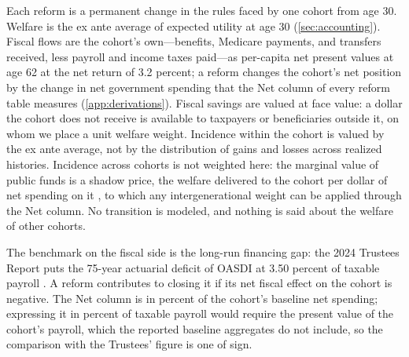 Each reform is a permanent change in the rules faced by one cohort from age 30. Welfare is the ex ante average of expected utility at age 30 (\autoref{sec:accounting}). Fiscal flows are the cohort's own---benefits, Medicare payments, and transfers received, less payroll and income taxes paid---as per-capita net present values at age 62 at the net return of 3.2 percent; a reform changes the cohort's net position by the change in net government spending that the Net column of every reform table measures (\autoref{app:derivations}). %
Fiscal savings are valued at face value: a dollar the cohort does not receive is available to taxpayers or beneficiaries outside it, on whom we place a unit welfare weight. Incidence within the cohort is valued by the ex ante average, not by the distribution of gains and losses across realized histories. Incidence across cohorts is not weighted here: the marginal value of public funds is a shadow price, the welfare delivered to the cohort per dollar of net spending on it \citep{hendren2020unified}, to which any intergenerational weight can be applied through the Net column. No transition is modeled, and nothing is said about the welfare of other cohorts.

The benchmark on the fiscal side is the long-run financing gap: the 2024 Trustees Report puts the 75-year actuarial deficit of OASDI at 3.50 percent of taxable payroll \citep{trustees2024}. %
A reform contributes to closing it if its net fiscal effect on the cohort is negative. The Net column is in percent of the cohort's baseline net spending; expressing it in percent of taxable payroll would require the present value of the cohort's payroll, which the reported baseline aggregates do not include, so the comparison with the Trustees' figure is one of sign.
